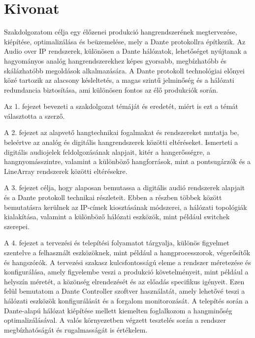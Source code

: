 \setcounter{page}{1}

\selecthungarian

\chapter*{Kivonat}

Szakdolgozatom célja egy élőzenei produkció hangrendszerének megtervezése, 
kiépítése, optimalizálása és beüzemelése, mely a Dante protokollra 
építkezik. Az Audio over IP rendszerek, különösen a Dante hálózatok, 
lehetőséget nyújtanak a hagyományos analóg hangrendszerekhez 
képes gyorsabb, megbízhatóbb és skálázhatóbb megoldások alkalmazására. 
A Dante protokoll technológiai előnyei közé tartozik az alacsony 
késleltetés, a magas szintű jelminőség és a hálózati redundancia 
biztosítása, ami különösen fontos az élő produkciók során.

Az 1. fejezet bevezeti a szakdolgozat témáját és eredetét,
miért is ezt a témát választotta a szerző.

A 2. fejezet az alapvető hangtechnikai fogalmakat és rendszereket 
mutatja be, beleértve az analóg és digitális hangrendszerek 
közötti eltéréseket. Ismerteti a digitális audiojelek 
feldolgozásának alapjait, kitér a hangerősségre, a hangnyomásszintre, valamint a 
különböző hangforrások, mint a pontsugárzók és a LineArray 
rendszerek közötti eltérésekre. 

A 3. fejezet célja, hogy alaposan bemutassa a digitális audió 
rendszerek alapjait és a Dante protokoll technikai részleteit. 
Ebben a részben többek között bemutatásra kerülnek az IP-címek kiosztásának módszerei, 
a hálózati topológiák kialakítása, 
valamint a különböző hálózati eszközök, mint például switchek szerepei.

A 4. fejezet a tervezési és telepítési folyamatot tárgyalja, 
különös figyelmet szentelve a felhasznált eszközöknek, 
mint például a hangprocesszorok, végerősítők és 
hangszórók. A tervezési szakasz kulcsfontosságú eleme a
rendszer méretezése és konfigurálása, amely figyelembe 
veszi a produkció követelményeit, mint például a helyszín 
méretét, a közönség elrendezését és az előadás 
specifikus igényeit. Ezen felül bemutatom a Dante 
Controller szoftver használatát, amely lehetővé teszi a 
hálózati eszközök konfigurálását és a forgalom 
monitorozását. 
A telepítés során a Dante-alapú hálózat  kiépítése mellett kiemelten
foglalkozom a hangminőség optimalizálásával. A valós környezetben 
végzett tesztelés során a rendszer megbízhatóságát és 
rugalmasságát is értékelem.


